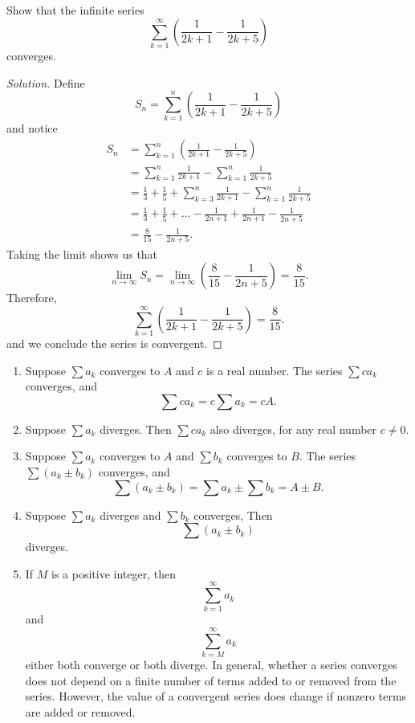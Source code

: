 \documentclass[compacto,10pt,comentarios]{aleph-notas}
\begin{document}
\begin{ejer}
    Show that the infinite series
    $$
        \sum_{k=1}^{\infty} \left( \frac{1}{2k+1} - \frac{1}{2k+5} \right)
    $$
    converges.
\end{ejer}
\begin{proof}[Solution]
    Define
    $$
        S_n = \sum_{k=1}^{n} \left( \frac{1}{2k+1} - \frac{1}{2k+5} \right)
    $$
    and notice
    \begin{align*}
     S_n & = \sum_{k=1}^{n} \left( \frac{1}{2k+1} - \frac{1}{2k+5} \right) \\
        & = \sum_{k=1}^{n}\frac{1}{2k+1} - \sum_{k=1}^{n} \frac{1}{2k+5} \\
        & = \frac{1}{3} + \frac{1}{5} + \sum_{k=3}^{n}\frac{1}{2k+1} - \sum_{k=1}^{n} \frac{1}{2k+5} \\
        & = \frac{1}{3}
            + \frac{1}{5} 
            + \ldots 
            - \frac{1}{2n+1}
            + \frac{1}{2n+1} - \frac{1}{2n+5} \\
        & = \frac{8}{15} - \frac{1}{2n+5}.
    \end{align*}
    Taking the limit shows us that
    $$
        \lim_{n \to \infty} S_n
        = \lim_{n \to \infty} \left( \frac{8}{15} - \frac{1}{2n+5} \right)
        = \frac{8}{15}.
    $$
    Therefore,
    $$
        \sum_{k=1}^{\infty} \left( \frac{1}{2k+1} - \frac{1}{2k+5} \right) = \frac{8}{15}.
    $$    
    and we conclude the series is convergent.
\end{proof}

\begin{teo}
    \begin{enumerate}
        \item Suppose $\sum a_k$ converges to $A$ and $c$ is a real number. The series $\sum c a_k$ converges, and
        $$
            \sum c a_k = c \sum a_k = c A.
        $$ 
        \item Suppose $\sum a_k$ diverges. Then $\sum c a_k$ also diverges, for any real number $c \neq 0$.
        \item Suppose $\sum a_k$ converges to $A$ and $\sum b_k$ converges to $B$. The series $\sum (a_k \pm b_k)$ converges, and
        $$
            \sum(a_k \pm b_k) = \sum a_k \pm \sum b_k = A \pm B.
        $$
        \item Suppose $\sum a_k$ diverges and $\sum b_k$ converges, Then 
        $$
            \sum (a_k \pm b_k)
        $$
        diverges.
        \item If $M$ is a positive integer, then
        $$
            \sum_{k=1}^{\infty} a_k
        $$
        and
        $$
            \sum_{k=M}^{\infty} a_k
        $$
        either both converge or both diverge. In general, whether a series converges does not depend on a finite number of terms added to or removed from the series. However, the value of a convergent series does change if nonzero terms are added or removed.
    \end{enumerate}
\end{teo}
\end{document}

